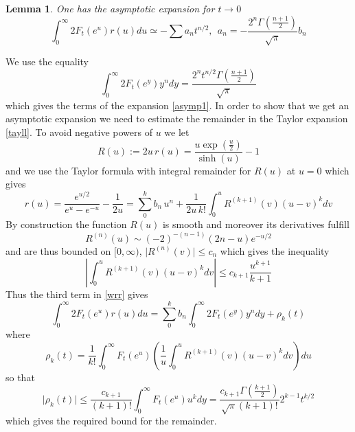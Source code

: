 \documentclass[reqno,12pt]{amsart}
\newtheorem{lem}[thm]{Lemma}
\begin{document}
\begin{lem}\label{asymplem} One has the asymptotic expansion for $t\to 0$
	 \begin{equation}\label{asymp1}
	  \int_{0}^\infty 2F_t(e^u)r(u)du\simeq	-\sum a_n t^{n/2}, \ \ a_n=-\frac{2^n \Gamma \left(\frac{n+1}{2}\right)}{\sqrt \pi}b_n
	 \end{equation}
\end{lem}
\proof We use the equality
   \begin{equation}\label{as3}
\int_0^\infty 2F_t(e^y)y^n dy=\frac{2^{n} t^{n/2} \Gamma \left(\frac{n+1}{2}\right)}{\sqrt{\pi }}
 \end{equation}
 which  gives the terms of the expansion \eqref{asymp1}.\newline
  In order to show that we get an asymptotic expansion we need to estimate the remainder in the Taylor expansion \eqref{tayll}. To avoid negative powers of $u$ we let 
  $$R(u):=2u\, r(u)=\frac{u \exp \left(\frac{u}{2}\right)}{\sinh (u)}-1$$
  and we use the Taylor formula with integral remainder for $R(u)$ at $u=0$ which gives
  \begin{equation}\label{tayll1}
 r(u)= \frac{e^{u/2}}{e^u-e^{-u}}-\frac {1}{2u}=\sum_0^k  b_n\, u^n+ \frac{1}{2u\, k!}\int_0^u R^{(k+1)}(v)(u-v)^k dv
   \end{equation}
   By construction the function $R(u)$ is smooth and moreover its derivatives fulfill
   $$
   R^{(n)}(u)\sim (-2)^{-(n-1)} (2 n-u)e^{-u/2}
   $$
   and are thus bounded on $[0,\infty)$, $\vert R^{(n)}(v)\vert\leq c_n$ which gives the inequality 
   $$
\left  \vert  \int_0^u R^{(k+1)}(v)(u-v)^k dv \right\vert \leq c_{k+1}\frac{u^{k+1}}{k+1}
   $$
   Thus the third term in \eqref{wrr} gives 
   $$
   \int_{0}^\infty 2F_t(e^u)r(u)du=\sum_0^k  b_n \int_0^\infty 2F_t(e^y)y^n dy+\rho_k(t)
   $$
   where 
   $$
   \rho_k(t)=\frac{1}{ k!}\int_{0}^\infty F_t(e^u)\left(\frac{1}{u}\int_0^u R^{(k+1)}(v)(u-v)^k dv\right)du
   $$
   so that 
   $$
   \vert \rho_k(t)\vert \leq \frac{c_{k+1}}{ (k+1)!}\int_0^\infty F_t(e^u)u^k dy=\frac{c_{k+1}\Gamma \left(\frac{k+1}{2}\right)}{\sqrt{\pi } (k+1)!}2^{k-1}t^{k/2}
   $$
   which gives the required bound for the remainder.
   \endproof 
\end{document}
